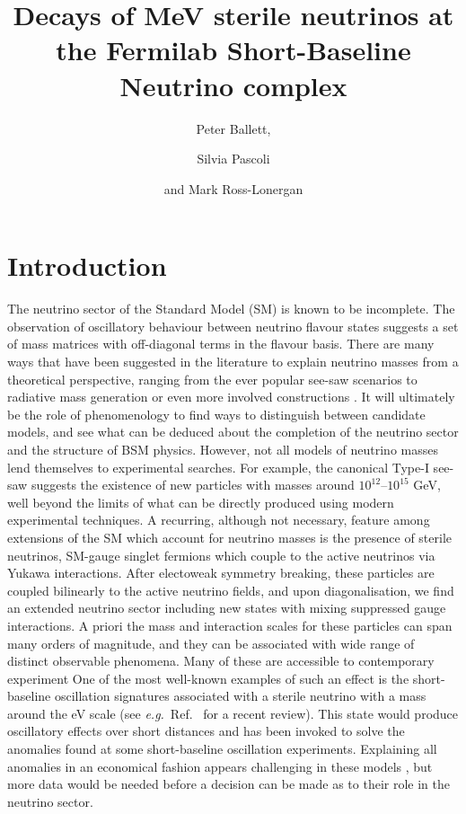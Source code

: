 \documentclass[11pt, a4paper]{article}
\title{Decays of MeV sterile neutrinos at the Fermilab Short-Baseline Neutrino complex}
\author{Peter Ballett,}
\author{Silvia Pascoli}
\author{and Mark Ross-Lonergan}
\affiliation{Institute for Particle Physics Phenomenology, Department of
Physics, Durham University, South Road, Durham DH1 3LE, United Kingdom}
\newcommand{\refref}[1]{Ref.~\cite{#1}}
\def\eg{\emph{e.g.}}
\begin{document}
 

\maketitle

\section{Introduction}

The neutrino sector of the Standard Model (SM) is known to be incomplete. The
observation of oscillatory behaviour between neutrino flavour states suggests a
set of mass matrices with off-diagonal terms in the flavour basis. There are
many ways that have been suggested in the literature to explain neutrino masses
from a theoretical perspective, ranging from the ever popular see-saw scenarios
\cite{Minkowski:1977sc, GellMann:1980vs, Mohapatra:1979ia} to radiative mass
generation \cite{Zee:1980ai,Babu:1988ki} or even more involved constructions
\cite{XXX}. It will ultimately be the role of phenomenology to find ways to
distinguish between candidate models, and see what can be deduced about the
completion of the neutrino sector and the structure of BSM physics.
%
However, not all models of neutrino masses lend themselves to experimental
searches. For example, the canonical Type-I see-saw \cite{Minkowski:1977sc,
GellMann:1980vs, Mohapatra:1979ia} suggests the existence of new particles with
masses around $10^{12}$--$10^{15}$ GeV, well beyond the limits of what can be
directly produced using modern experimental techniques. A recurring, although
not necessary, feature among extensions of the SM which account for neutrino
masses is the presence of sterile neutrinos, SM-gauge singlet fermions which
couple to the active neutrinos via Yukawa interactions. After electoweak
symmetry breaking, these particles are coupled bilinearly to the active
neutrino fields, and upon diagonalisation, we find an extended neutrino sector
including new states with mixing suppressed gauge interactions. A priori the
mass and interaction scales for these particles can span many orders of
magnitude, and they can be associated with wide range of distinct observable
phenomena. Many of these are accessible to contemporary experiment
%
One of the most well-known examples of such an effect is the short-baseline
oscillation signatures associated with a sterile neutrino with a mass around
the eV scale (see \eg\ \refref{Gariazzo:2015rra} for a recent review). This
state would produce oscillatory effects over short distances and has been
invoked to solve the anomalies found at some short-baseline oscillation
experiments.  Explaining all anomalies in an economical fashion appears
challenging in these models \cite{Kopp:2013vaa,Conrad:2012qt}, but more data
would be needed before a decision can be made as to their role in the neutrino
sector.
\end{document}
